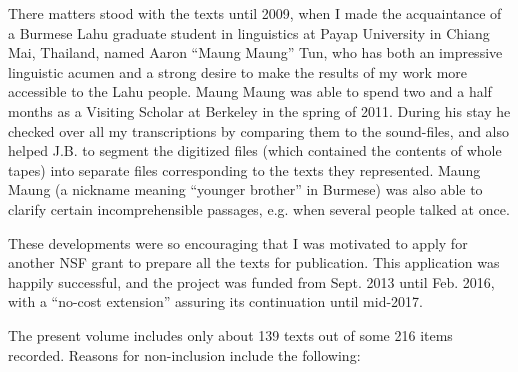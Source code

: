 There matters stood with the texts until 2009, when I made the
acquaintance of a Burmese Lahu graduate student in linguistics at Payap
University in Chiang Mai, Thailand, named Aaron ``Maung Maung'' Tun, who
has both an impressive linguistic acumen and a strong desire to make the
results of my work more accessible to the Lahu people. Maung Maung was
able to spend two and a half months as a Visiting Scholar at Berkeley in
the spring of 2011. During his stay he checked over all my
transcriptions by comparing them to the sound-files, and also helped
J.B. to segment the digitized files (which contained the contents of
whole tapes) into separate files corresponding to the texts they
represented. Maung Maung (a nickname meaning ``younger brother'' in
Burmese) was also able to clarify certain incomprehensible passages,
e.g. when several people talked at once.

These developments were so encouraging that I was motivated to apply for
another NSF grant to prepare all the texts for publication. This
application was happily successful, and the project was funded from
Sept. 2013 until Feb. 2016, with a ``no-cost extension'' assuring its
continuation until mid-2017.

The present volume includes only about 139 texts out of some 216 items
recorded. Reasons for non-inclusion include the following:

